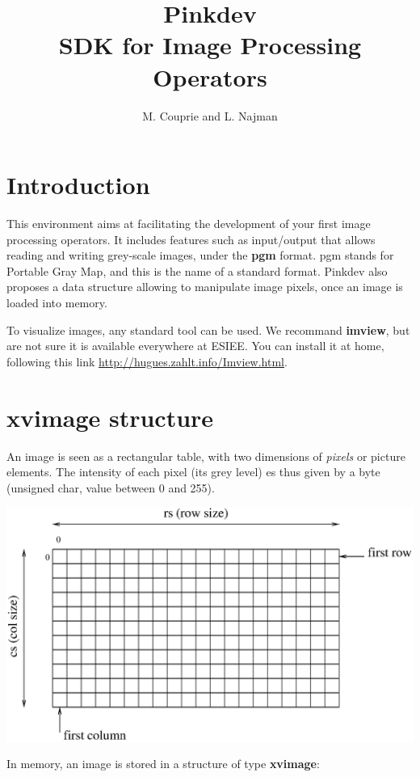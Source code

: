 \documentclass{article}
\begin{document}
\title{Pinkdev\\
SDK for Image Processing Operators
}
\author{M. Couprie and L. Najman}

\maketitle
\section{Introduction}

This environment aims at facilitating the development of your first
image processing operators. It includes features such as input/output
that allows reading and writing grey-scale images, under the {\bf pgm}
format.  pgm stands for Portable Gray Map, and this is the name of a
standard format. Pinkdev also proposes a data structure allowing to
manipulate image pixels, once an image is loaded into memory.

To visualize images, any standard tool can be used. We recommand {\bf
  imview}, but are not sure it is available everywhere at ESIEE.  You
can install it at home, following this link
\url{http://hugues.zahlt.info/Imview.html}.


\section{xvimage structure}

An image is seen as a rectangular table, with two dimensions of {\em
  pixels} or picture elements. The intensity of each pixel (its grey
level) es thus given by a byte (unsigned char, value between 0 and
255).

\includegraphics{xvimage1}

In memory, an image is stored in a structure of type {\bf xvimage}:
\end{document}
